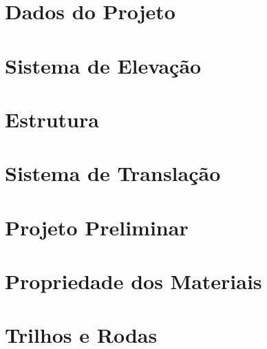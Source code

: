 \documentclass[12pt,a4paper,oneside]{report}
\newcommand{\cabecalhosecao}{}
\begin{document}
\chapter{Dados do Projeto}


\chapter{Sistema de Elevação}


\chapter{Estrutura}


\chapter{Sistema de Translação}


\appendix
\chapter{Projeto Preliminar}


\chapter{Propriedade dos Materiais}


\chapter{Trilhos e Rodas}


\clearpage
\gdef\cabecalhosecao{\bibname}


\end{document}
